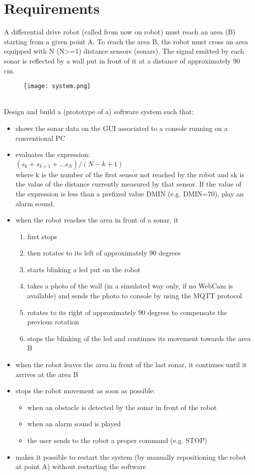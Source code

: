 \section{Requirements}
A differential drive robot (called from now on robot) must reach an area (B) starting from a given point A. To reach the area B, the robot must cross an area equipped with N (N>=1) distance sensors (sonars). The signal emitted by each sonar is reflected by a wall put in front of it at a distance of approximately 90 cm.
\begin{figure}[h]
	\centering
	\texttt{[image: system.png]}
\end{figure}
\\
Design and build a (prototype of a) software system such that:
\begin{itemize}
	\item shows the sonar data on the GUI associated to a console running on a conventional PC
	\item evaluates the expression: \\
			$ (s_{k} + s_{k+1} + ... s_{N}) / (N-k+1) $ \\
			where k is the number of the first sensor not reached by the robot and sk is the value of the distance currently measured by that sensor. If the value of the expression is less than a prefixed value DMIN (e.g. DMIN=70), play an alarm sound.
	\item when the robot reaches the area in front of a sonar, it
			\begin{enumerate}
				\item first stops
				\item then rotates to its left of approximately 90 degrees
				\item starts blinking a led put on the robot
				\item takes a photo of the wall (in a simulated way only, if no WebCam is available) and sends the photo to console by using the MQTT protocol
				\item rotates to its right of approximately 90 degrees to compensate the previous rotation
				\item stops the blinking of the led and continues its movement towards the area B
			\end{enumerate}
	\item when the robot leaves the area in front of the last sonar, it continues until it arrives at the area B
	\item stops the robot movement as soon as possible:
	\begin{itemize}
		\item when an obstacle is detected by the sonar in front of the robot
		\item when an alarm sound is played
		\item the user sends to the robot a proper command (e.g. STOP)
	\end{itemize}
	\item makes it possible to restart the system (by manually repositioning the robot at point A) without restarting the software
\end{itemize}
